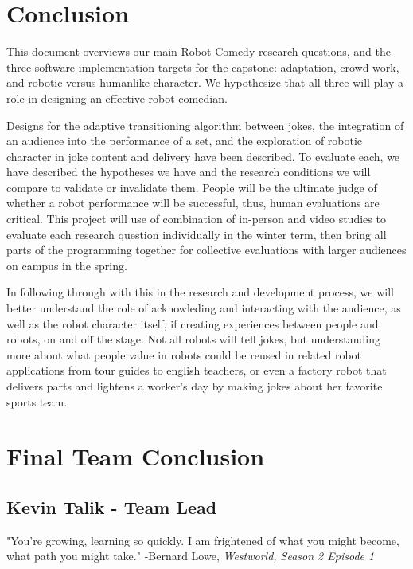 \documentclass[onecolumn, draftclsnofoot,10pt, compsoc]{IEEEtran}
\begin{document}
\section{Conclusion}
This document overviews our main Robot Comedy research questions, and the three software implementation targets
for the capstone: adaptation, crowd work, and robotic versus humanlike character. We hypothesize that all three will
play a role in designing an effective robot comedian.

Designs for the adaptive transitioning algorithm between jokes, the integration of an audience into the performance
of a set, and the exploration of robotic character in joke content and delivery have been described. To evaluate each,
we have described the hypotheses we have and the research conditions we will compare to validate or invalidate them.
People will be the ultimate judge of whether a robot performance will be successful, thus, human evaluations are critical.
This project will use of combination of in-person and video studies to evaluate each research question individually in
the winter term, then bring all parts of the programming together for collective evaluations with larger audiences on
campus in the spring.

In following through with this in the research and development process, we will better understand the role of
acknowleding and interacting with the audience, as well as the robot character itself, if creating experiences between
people and robots, on and off the stage. Not all robots will tell jokes, but understanding more about what people value
in robots could be reused in related robot applications from tour guides to english teachers, or even a factory robot that
delivers parts and lightens a worker’s day by making jokes about her favorite sports team.

\section{Final Team Conclusion}
\subsection{Kevin Talik - Team Lead}
	\begin{displayquote}
	"You're growing, learning so quickly. I am frightened of what you might become, what path you might take."
	-Bernard Lowe, \textit{Westworld, Season 2 Episode 1}
	\end{displayquote}
\end{document}
